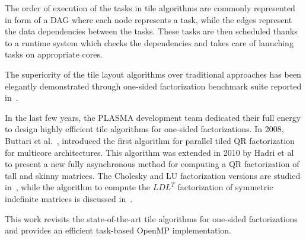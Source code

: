 The order of execution of the tasks in tile algorithms are commonly
represented in form of a DAG where each node represents a task, while
the edges represent the data dependencies between the tasks.  These
tasks are then scheduled thanks to a runtime system which checks the
dependencies and takes care of launching tasks on appropriate cores.

The superiority of the tile layout algorithms over traditional
approaches has been elegantly demonstrated through one-sided
factorization benchmark suite reported in~\cite{agullo2009comparative}.

In the last few years,
the PLASMA development team dedicated their full
energy to design highly efficient tile
algorithms for one-sided factorizations.
In 2008, Buttari et al.~\cite{buttari2008parallel},
introduced the first algorithm for parallel tiled QR factorization for
multicore architectures.
This algorithm was extended in 2010 by
Hadri et al~\cite{hadri2010tile} to present a new fully asynchronous
method for computing a QR factorization of tall and skinny matrices.
The Cholesky and LU factorization versions are studied
in~\cite{DBLP:journals/corr/abs-0709-1272}, while the algorithm to
compute the $LDL^T$ factorization of symmetric indefinite matrices is
discussed in~\cite{becker2011towards}.

This work revisits the state-of-the-art tile algorithms for
one-sided factorizations and provides an
efficient task-based OpenMP implementation.
